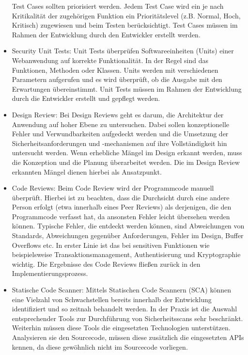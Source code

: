 \documentclass[12pt,oneside,a4paper,parskip]{scrbook}
\begin{document}
\begin{itemize}
    Test Cases sollten priorisiert werden. Jedem Test Case wird ein je nach Kritikalität der zugehörigen
    Funktion ein Prioritätslevel (z.B. Normal, Hoch, Kritisch) zugewiesen und beim Testen
    berücksichtigt.
    Test Cases müssen im Rahmen der Entwicklung durch den Entwickler erstellt werden.
    \item Security Unit Tests:
    Unit Tests überprüfen Softwareeinheiten (Units) einer Webanwendung auf korrekte Funktionalität.
    In der Regel sind das Funktionen, Methoden oder Klassen. Units werden mit verschiedenen
    Parametern aufgerufen und es wird überprüft, ob die Ausgabe mit den Erwartungen
    übereinstimmt.
    Unit Tests müssen im Rahmen der Entwicklung durch die Entwickler erstellt und gepflegt werden.
    \item Design Review:
    Bei Design Reviews geht es darum, die Architektur der Anwendung auf hoher Ebene zu
    untersuchen. Dabei sollen konzeptionelle Fehler und Verwundbarkeiten aufgedeckt werden und
    die Umsetzung der Sicherheitsanforderungen und -mechanismen auf ihre Vollständigkeit hin
    untersucht werden. Wenn erhebliche Mängel im Design erkannt werden, muss die Konzeption und die Planung überarbeitet werden. Die im Design Review erkannten Mängel dienen hierbei als Ansatzpunkt.
    \item Code Reviews:
    Beim Code Review wird der Programmcode manuell überprüft. Hierbei ist zu beachten, dass die
    Durchsicht durch eine andere Person erfolgt (etwa innerhalb eines Peer Reviews) als derjenigen, die
    den Programmcode verfasst hat, da ansonsten Fehler leicht übersehen werden können. Typische
    Fehler, die entdeckt werden können, sind Abweichungen von Standards, Abweichungen gegenüber
    Anforderungen, Fehler im Design, Buffer Overflows etc. In erster Linie ist das bei sensitiven
    Funktionen wie beispielsweise Transaktionsmanagement, Authentisierung und Kryptographie
    wichtig. Die Ergebnisse des Code Reviews fließen zurück in den Implementierungsprozess.
    \item Statische Code Scanner:
    Mittels Statischen Code Scannern (SCA) können eine Vielzahl von Schwachstellen bereits innerhalb
    der Entwicklung identifiziert und so zeitnah behandelt werden. In der Praxis ist die Auswahl
    entsprechender Tools zur Durchführung von Sicherheitsscans sehr beschränkt. Weiterhin müssen
    diese Tools die eingesetzten Technologien unterstützen. Analysieren sie den Sourcecode, müssen
    diese zusätzlich die eingesetzten APIs kennen, da diese gewöhnlich nicht im Sourcecode vorliegen.

\end{itemize}
\end{document}
